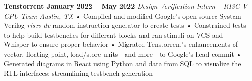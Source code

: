 \documentclass[../main.tex]{subfiles}
\begin{document}
%
\noindent\textbf{{\fontsize{\textFontSize}{\textFontBox}\selectfont Tenstorrent \hfill January 2022 – May 2022}}
\vspace{0.5mm}\newline
%
%
{\fontsize{\textFontSize}{\textFontBox}\selectfont\emph{Design Verification Intern – RISC-V CPU Team \hfill Austin, TX \hspace{0 cm}}}\vspace{0mm}\newline
%
%
{\fontsize{\textFontSize}{\textFontBox}\selectfont • \hspace{1mm} Compiled and modified Google’s open-source System Verilog \emph{riscv-dv} random instruction generator to create tests }\newline
{\fontsize{\textFontSize}{\textFontBox}\selectfont • \hspace{1mm} Constrained tests to help build testbenches for different blocks and ran stimuli on VCS and Whisper to ensure proper behavior }\newline
{\fontsize{\textFontSize}{\textFontBox}\selectfont • \hspace{1mm} Migrated Tenstorrent’s enhancements of vector, floating point, load/store units - and more - to Google’s head commit }\newline
{\fontsize{\textFontSize}{\textFontBox}\selectfont • \hspace{1mm} Generated diagrams in React using Python and data from SQL to visualize the RTL interfaces; streamlining testbench generation }\vspace{2mm}\newline
%
%
\end{document}
